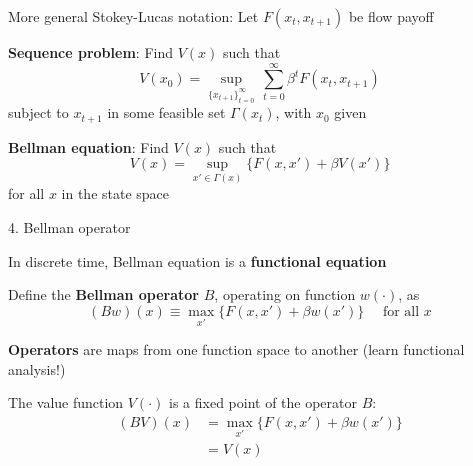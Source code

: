\documentclass[11pt, aspectratio=169]{beamer}
\newenvironment{witemize}{\itemize\addtolength{\itemsep}{10pt}}{\enditemize}
\begin{document}
\begin{frame}{}

More general Stokey-Lucas notation: Let $F(x_t, x_{t+1})$ be flow payoff

\vspace{8mm}
\textbf{Sequence problem}: Find $V(x)$ such that 
\begin{equation*}
	V(x_0) = \sup_{ \{ x_{t+1} \}_{t=0}^\infty} \, \sum_{t=0}^\infty \beta^t F(x_t, x_{t+1})
\end{equation*}
subject to $x_{t+1}$ in some feasible set $\Gamma(x_t)$, with $x_0$ given

\vspace{8mm}
\textbf{Bellman equation}: Find $V(x)$ such that 
\begin{equation*}
	V(x) = \sup_{x' \in \Gamma(x)} \Big\{ F(x, x') + \beta V(x') \Big\}
\end{equation*}
for all $x$ in the state space

\end{frame}



\begin{frame}{4. Bellman operator}
\begin{witemize}
\item In discrete time, Bellman equation is a \textbf{functional equation}

\item Define the \textbf{Bellman operator} $B$, operating on function $w(\cdot)$, as
\begin{equation*}
	(Bw)(x) \equiv \max_{x'} \Big\{ F(x, x') + \beta w(x') \Big\} \quad \text{ for all } x
\end{equation*}

\item \textbf{Operators} are maps from one function space to another (learn functional analysis!)

\item The value function $V(\cdot)$ is a fixed point of the operator $B$:
\begin{align*}
	(BV)(x) &= \max_{x'} \Big\{ F(x, x') + \beta w(x') \Big\} \\
	&= V(x)
\end{align*}

\end{witemize}
\end{frame}
\end{document}
